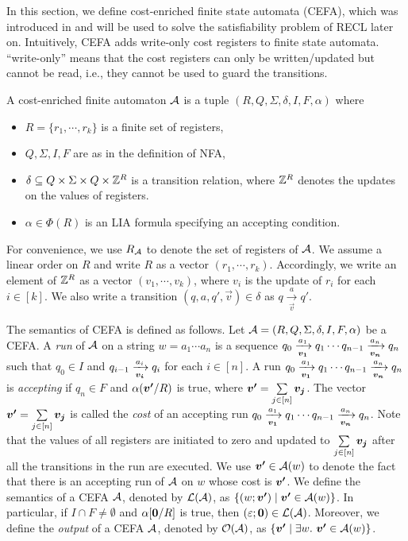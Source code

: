In this section, we define cost-enriched finite state automata (CEFA), which was introduced in \cite{atva2020} and will be used to solve the satisfiability problem of RECL later on. 
%
Intuitively, CEFA adds write-only cost registers to finite state automata. ``write-only'' means that the cost registers can only be written/updated but cannot be read, i.e., they cannot be used to guard the transitions. 
%
\begin{definition}
  A cost-enriched finite automaton $\mathcal{A}$ is a tuple $(R, Q, \Sigma, \delta, I, F, \alpha)$ where
  \begin{itemize}
  \item $R = \{r_1, \cdots, r_k\}$ is a finite set of registers, 
    \item $Q, \Sigma, I, F$ are as in the definition of NFA,
    \item $\delta \subseteq Q \times \Sigma \times Q \times \mathbb{Z}^R$ is a transition relation, where $\mathbb{Z}^R$ denotes the updates on the values of registers.
    \item $\alpha \in \Phi(R)$ is an LIA formula specifying an accepting condition.
  \end{itemize}
\end{definition}

For convenience, we use $R_{\mathcal{A}}$ to denote the set of registers of $\mathcal{A}$. We assume a linear order on $R$ and write $R$ as a vector $(r_1, \cdots, r_k)$. Accordingly, we write an element of $\mathbb{Z}^R$ as a vector $(v_1, \cdots, v_k)$, where $v_i$ is the update of $r_i$ for each $i \in [k]$. We also write a transition $(q, a, q', \vec{v}) \in \delta$ as $q \xrightarrow[\vec{v}]{a} q'$.

The semantics of CEFA is defined as follows. Let $\mathcal{A} = (R, Q, \Sigma, \delta, I, F, \alpha)$ be a CEFA. 
A \emph{run} of $\mathcal{A}$ on a string $w = a_1 \cdots a_n$ is a sequence $q_0 \xrightarrow[\myvec{v_1}]{a_1} q_1 \cdots q_{n-1}\xrightarrow[\myvec{v_n}]{a_n} q_n$ such that $q_0 \in I$ and $q_{i-1} \xrightarrow[\myvec{v_i}]{a_i} q_i$ for each $i \in [n]$. A run $q_0 \xrightarrow[\myvec{v_1}]{a_1} q_1 \cdots q_{n-1}\xrightarrow[\myvec{v_n}]{a_n} q_n$ is \emph{accepting} if $q_n \in F$ and $\alpha(\myvec{v'}/R)$ is true, where $\myvec{v'} = \sum \limits_{j \in [n]} \myvec{v_j}$. The vector $\myvec{v'}= \sum \limits_{j \in [n]} \myvec{v_j}$ is called the \emph{cost} of an accepting run $q_0 \xrightarrow[\myvec{v_1}]{a_1} q_1 \cdots q_{n-1}\xrightarrow[\myvec{v_n}]{a_n} q_n$. Note that the values of all registers are initiated to zero and updated to $\sum \limits_{j \in [n]} \myvec{v_j}$ after all the transitions in the run are executed. We use $\myvec{v'} \in \aut(w)$ to denote the fact that there is an accepting run of $\mathcal{A}$ on $w$ whose cost is $\myvec{v'}$.  
We define the semantics of a CEFA $\mathcal{A}$, denoted by $\mathcal{L}(\mathcal{A})$, as $\{(w; \myvec{v'}) \mid  \myvec{v'} \in \aut(w)\}$.  In particular, if $I \cap F \neq \emptyset$ and $\alpha[\myvec{0}/R]$ is true, then $(\varepsilon; \myvec{0}) \in \Lang(\aut)$. Moreover, we define the \emph{output} of a CEFA $\mathcal{A}$, denoted by $\mathcal{O}(\mathcal{A})$, as $\{\myvec{v'} \mid  \exists w.\ \myvec{v'} \in \aut(w)\}$.

